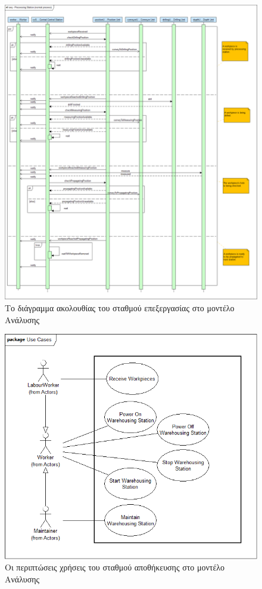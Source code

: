 \documentclass[a4paper,12pt,twoside]{report}
\begin{document}
\begin{appendices}
			\begin{figure}[hp]
					\centering
					\includegraphics[scale=0.30]{AnalysisModel_seq-ProcessingStation(normalprocess).png}
					\caption{Το διάγραμμα ακολουθίας του σταθμού επεξεργασίας στο μοντέλο Ανάλυσης}
					\label{φωτ:Το διάγραμμα ακολουθίας του σταθμού επεξεργασίας στο μοντέλο Ανάλυσης}
			\end{figure}
			
			\begin{figure}[hp]
					\centering
					\includegraphics[scale=0.30]{AnalysisModel_uc-WarehousingStationsUseCases.png}
					\caption{Οι περιπτώσεις χρήσεις του σταθμού αποθήκευσης στο μοντέλο Ανάλυσης}
					\label{φωτ:Οι περιπτώσεις χρήσεις του σταθμού αποθήκευσης στο μοντέλο Ανάλυσης}
			\end{figure}


\end{appendices}
\end{document}
